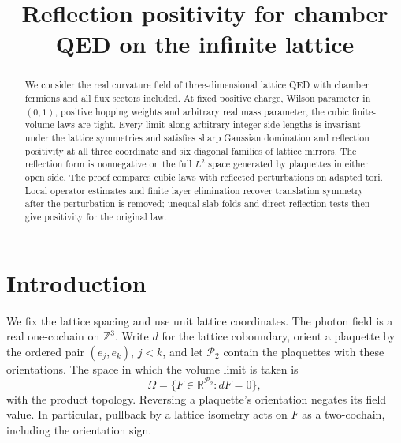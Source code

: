   \RequirePackage[backend=biber,style=alphabetic,backref=true,
    giveninits=true,isbn=false,date=year]{biblatex}
  
  \setcounter{biburlnumpenalty}{100}
  \setcounter{biburllcpenalty}{100}
  \setcounter{biburlucpenalty}{100}
  \renewcommand*{\bibfont}{\footnotesize}
\makeatother
\newcommand{\R}{\mathbb R}
\newcommand{\C}{\mathbb C}
\newcommand{\Z}{\mathbb Z}
\newcommand{\N}{\mathbb N}
\newcommand{\E}{\mathbb E}
\newcommand{\dd}{\mathrm d}
\DeclareMathOperator{\supp}{supp}
\DeclareMathOperator{\tr}{tr}
\DeclareMathOperator{\diag}{diag}
\allowdisplaybreaks[2]
\title[Reflection positivity on the infinite lattice]{Reflection positivity for chamber QED on the infinite lattice}
\date{}

\begin{abstract}
We consider the real curvature field of three-dimensional lattice QED
with chamber fermions and all flux sectors included. At fixed positive
charge, Wilson parameter in $(0,1)$, positive hopping weights and
arbitrary real mass parameter, the cubic finite-volume laws are tight.
Every limit along arbitrary integer side lengths is invariant under
the lattice symmetries and satisfies sharp Gaussian domination and
reflection positivity at all three coordinate and six diagonal
families of lattice mirrors. The reflection form is nonnegative on
the full $L^2$ space generated by plaquettes in either open side.
The proof compares cubic laws with reflected perturbations on adapted
tori. Local operator estimates and finite layer elimination recover
translation symmetry after the perturbation is removed; unequal slab
folds and direct reflection tests then give positivity for the original law.
\end{abstract}
\maketitle
\tableofcontents
\section{Introduction}\label{sec:introduction}

We fix the lattice spacing and use unit lattice coordinates. The photon
field is a real one-cochain on $\Z^3$. Write $d$ for the lattice
coboundary, orient a plaquette by the ordered pair $(e_j,e_k)$, $j<k$,
and let $\mathcal P_2$ contain the plaquettes with these orientations.
The space in which the volume limit is taken is
\[
 \Omega=\{F\in\R^{\mathcal P_2}:dF=0\},
\]
with the product topology. Reversing a plaquette's orientation negates
its field value. In particular, pullback by a lattice isometry acts on
$F$ as a two-cochain, including the orientation sign.

